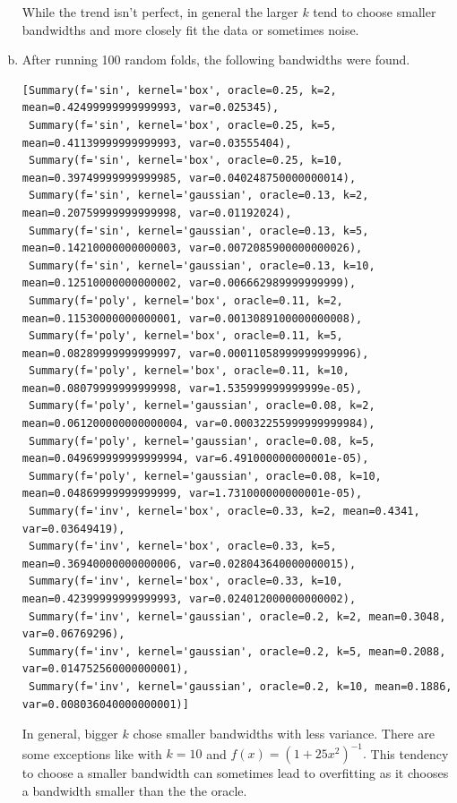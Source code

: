 \documentclass[letterpaper]{article}
\begin{document}
\begin{enumerate}[(a)]
  While the trend isn't perfect, in general the larger $k$ tend to choose
  smaller bandwidths and more closely fit the data or sometimes noise.
\item After running 100 random folds, the following bandwidths were found.
  {\footnotesize
  \begin{verbatim}
[Summary(f='sin', kernel='box', oracle=0.25, k=2, mean=0.42499999999999993, var=0.025345),
 Summary(f='sin', kernel='box', oracle=0.25, k=5, mean=0.41139999999999993, var=0.03555404),
 Summary(f='sin', kernel='box', oracle=0.25, k=10, mean=0.39749999999999985, var=0.040248750000000014),
 Summary(f='sin', kernel='gaussian', oracle=0.13, k=2, mean=0.20759999999999998, var=0.01192024),
 Summary(f='sin', kernel='gaussian', oracle=0.13, k=5, mean=0.14210000000000003, var=0.0072085900000000026),
 Summary(f='sin', kernel='gaussian', oracle=0.13, k=10, mean=0.12510000000000002, var=0.006662989999999999),
 Summary(f='poly', kernel='box', oracle=0.11, k=2, mean=0.11530000000000001, var=0.0013089100000000008),
 Summary(f='poly', kernel='box', oracle=0.11, k=5, mean=0.08289999999999997, var=0.00011058999999999996),
 Summary(f='poly', kernel='box', oracle=0.11, k=10, mean=0.08079999999999998, var=1.535999999999999e-05),
 Summary(f='poly', kernel='gaussian', oracle=0.08, k=2, mean=0.061200000000000004, var=0.00032255999999999984),
 Summary(f='poly', kernel='gaussian', oracle=0.08, k=5, mean=0.049699999999999994, var=6.491000000000001e-05),
 Summary(f='poly', kernel='gaussian', oracle=0.08, k=10, mean=0.04869999999999999, var=1.731000000000001e-05),
 Summary(f='inv', kernel='box', oracle=0.33, k=2, mean=0.4341, var=0.03649419),
 Summary(f='inv', kernel='box', oracle=0.33, k=5, mean=0.36940000000000006, var=0.028043640000000015),
 Summary(f='inv', kernel='box', oracle=0.33, k=10, mean=0.42399999999999993, var=0.024012000000000002),
 Summary(f='inv', kernel='gaussian', oracle=0.2, k=2, mean=0.3048, var=0.06769296),
 Summary(f='inv', kernel='gaussian', oracle=0.2, k=5, mean=0.2088, var=0.014752560000000001),
 Summary(f='inv', kernel='gaussian', oracle=0.2, k=10, mean=0.1886, var=0.008036040000000001)]
\end{verbatim}}
    
    In general, bigger $k$ chose smaller bandwidths with less variance. There
    are some exceptions like with $k = 10$ and
    $f(x) = \left(1 + 25x^2\right)^{-1}.$ This tendency to choose a smaller
    bandwidth can sometimes lead to overfitting as it chooses a bandwidth
    smaller than the the oracle.
\end{enumerate}
\end{document}
